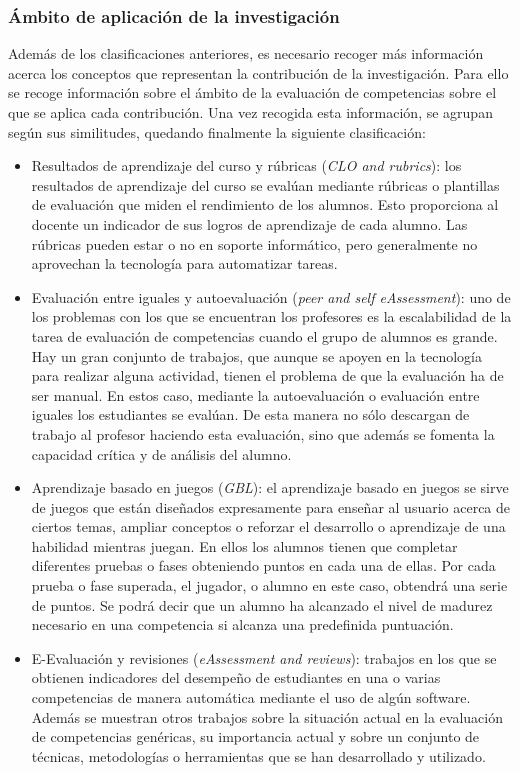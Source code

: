 \subsubsection{Ámbito de aplicación de la investigación}
Además de los clasificaciones anteriores, es necesario recoger más información acerca los conceptos que representan la contribución de la investigación. Para ello se recoge información sobre el ámbito de la evaluación de competencias sobre el que se aplica cada contribución. Una vez recogida esta información, se agrupan según sus similitudes, quedando finalmente la siguiente clasificación:
\begin{itemize}
\item Resultados de aprendizaje del curso y rúbricas (\emph{CLO and rubrics}): los resultados de aprendizaje del curso se evalúan mediante rúbricas o plantillas de evaluación que miden el rendimiento de los alumnos. Esto proporciona al docente un indicador de sus logros de aprendizaje de cada alumno. Las rúbricas pueden estar o no en soporte informático, pero generalmente no aprovechan la tecnología para automatizar tareas.
\item Evaluación entre iguales y autoevaluación (\emph{peer and self eAssessment}): uno de los problemas con los que se encuentran los profesores es la escalabilidad de la tarea de evaluación de competencias cuando el grupo de alumnos es grande. Hay un gran conjunto de trabajos, que aunque se apoyen en la tecnología para realizar alguna actividad, tienen el problema de que la evaluación ha de ser manual. En estos caso, mediante la autoevaluación o evaluación entre iguales los estudiantes se evalúan. De esta manera no sólo descargan de trabajo al profesor haciendo esta evaluación, sino que además se fomenta la capacidad crítica y de análisis del alumno.
\item Aprendizaje basado en juegos (\emph{GBL}): el aprendizaje basado en juegos se sirve de juegos que están diseñados expresamente para enseñar al usuario acerca de ciertos temas, ampliar conceptos o reforzar el desarrollo o aprendizaje de una habilidad mientras juegan. En ellos los alumnos tienen que completar diferentes pruebas o fases obteniendo puntos en cada una de ellas. Por cada prueba o fase superada, el jugador, o alumno en este caso, obtendrá una serie de puntos. Se podrá decir que un alumno ha alcanzado el nivel de madurez necesario en una competencia si alcanza una predefinida puntuación.
\item E-Evaluación y revisiones (\emph{eAssessment and reviews}): trabajos en los que se obtienen indicadores del desempeño de estudiantes en una o varias competencias de manera automática mediante el uso de algún software. Además se muestran otros trabajos sobre la situación actual en la evaluación de competencias genéricas, su importancia actual y sobre un conjunto de técnicas, metodologías o herramientas que se han desarrollado y utilizado.
\end{itemize}


